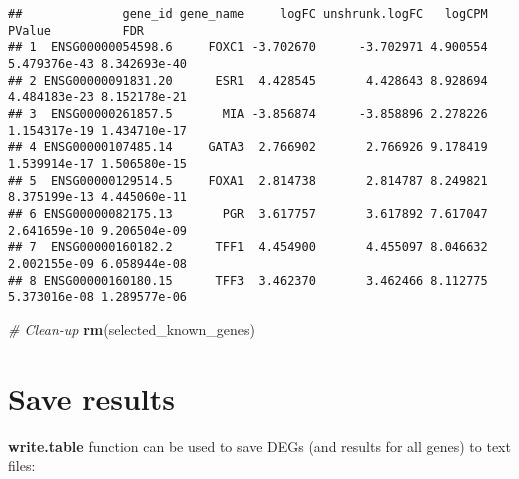 \documentclass[]{book}
\newenvironment{Shaded}{\begin{snugshade}}{\end{snugshade}}
\newcommand{\KeywordTok}[1]{\textcolor[rgb]{0.13,0.29,0.53}{\textbf{#1}}}
\newcommand{\FloatTok}[1]{\textcolor[rgb]{0.00,0.00,0.81}{#1}}
\newcommand{\StringTok}[1]{\textcolor[rgb]{0.31,0.60,0.02}{#1}}
\newcommand{\CommentTok}[1]{\textcolor[rgb]{0.56,0.35,0.01}{\textit{#1}}}
\newcommand{\OperatorTok}[1]{\textcolor[rgb]{0.81,0.36,0.00}{\textbf{#1}}}
\newcommand{\NormalTok}[1]{#1}
\begin{document}
\begin{Shaded}
\end{Shaded}

\begin{verbatim}
##              gene_id gene_name     logFC unshrunk.logFC   logCPM       PValue          FDR
## 1  ENSG00000054598.6     FOXC1 -3.702670      -3.702971 4.900554 5.479376e-43 8.342693e-40
## 2 ENSG00000091831.20      ESR1  4.428545       4.428643 8.928694 4.484183e-23 8.152178e-21
## 3  ENSG00000261857.5       MIA -3.856874      -3.858896 2.278226 1.154317e-19 1.434710e-17
## 4 ENSG00000107485.14     GATA3  2.766902       2.766926 9.178419 1.539914e-17 1.506580e-15
## 5  ENSG00000129514.5     FOXA1  2.814738       2.814787 8.249821 8.375199e-13 4.445060e-11
## 6 ENSG00000082175.13       PGR  3.617757       3.617892 7.617047 2.641659e-10 9.206504e-09
## 7  ENSG00000160182.2      TFF1  4.454900       4.455097 8.046632 2.002155e-09 6.058944e-08
## 8 ENSG00000160180.15      TFF3  3.462370       3.462466 8.112775 5.373016e-08 1.289577e-06
\end{verbatim}

\begin{Shaded}
\begin{Highlighting}[]
\CommentTok{# Clean-up}
\KeywordTok{rm}\NormalTok{(selected_known_genes)}
\end{Highlighting}
\end{Shaded}

\section{Save results}\label{save-results-1}

\textbf{write.table} function can be used to save DEGs (and results for
all genes) to text files:
\end{document}
